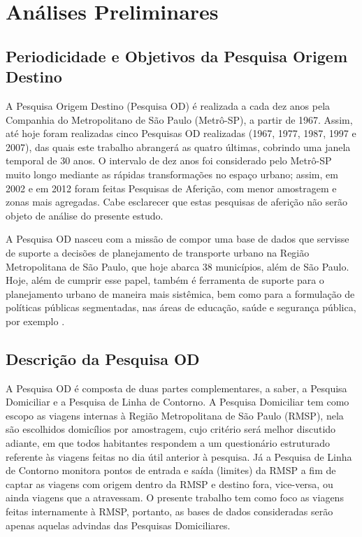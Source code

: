 \chapter{Análises Preliminares}\label{chap:analises-preliminares}

\section{Periodicidade e Objetivos da Pesquisa Origem Destino}\label{sec:period-obj}

A Pesquisa Origem Destino (Pesquisa OD) é realizada a cada dez anos pela Companhia do Metropolitano de São Paulo (Metrô-SP), a partir de 1967. Assim, até hoje foram realizadas cinco Pesquisas OD realizadas (1967, 1977, 1987, 1997 e 2007), das quais este trabalho abrangerá as quatro últimas, cobrindo uma janela temporal de 30 anos. O intervalo de dez anos foi considerado pelo Metrô-SP muito longo mediante as rápidas transformações no espaço urbano; assim, em 2002 e em 2012 foram feitas Pesquisas de Aferição, com menor amostragem e zonas mais agregadas. Cabe esclarecer que estas pesquisas de aferição não serão objeto de análise do presente estudo.

A Pesquisa OD nasceu com a missão de compor uma base de dados que servisse de suporte a decisões de planejamento de transporte urbano na Região Metropolitana de São Paulo, que hoje abarca 38 municípios, além de São Paulo. Hoje, além de cumprir esse papel, também é ferramenta de suporte para o planejamento urbano de maneira mais sistêmica, bem como para a formulação de políticas públicas segmentadas, nas áreas de educação, saúde e segurança pública, por exemplo \cite{MANUALOD2007}.

\section{Descrição da Pesquisa OD}\label{sec:descricao-OD}

A Pesquisa OD é composta de duas partes complementares, a saber, a Pesquisa Domiciliar e a Pesquisa de Linha de Contorno. A Pesquisa Domiciliar tem como escopo as viagens internas à Região Metropolitana de São Paulo (RMSP), nela são escolhidos domicílios por amostragem, cujo critério será melhor discutido adiante, em que todos habitantes respondem a um questionário estruturado referente às viagens feitas no dia útil anterior à pesquisa. Já a Pesquisa de Linha de Contorno monitora pontos de entrada e saída (limites) da RMSP a fim de captar as viagens com origem dentro da RMSP e destino fora, vice-versa, ou ainda viagens que a atravessam. O presente trabalho tem como foco as viagens feitas internamente à RMSP, portanto, as bases de dados consideradas serão apenas aquelas advindas das Pesquisas Domiciliares.

